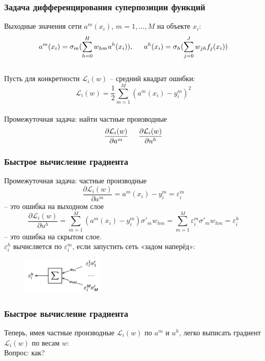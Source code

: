 \documentclass[12pt]{beamer}
\begin{document}
\begin{frame}\frametitle{Задача дифференцирования суперпозиции функций}
Выходные значения сети $a^m(x_i)$, $m = 1,\dots,M$ на объекте $x_i$:\\
$$a^m(x_i) = \sigma_m (\sum\limits_{h=0}^H w_{hm} u^h(x_i)), \hspace{5mm} u^h(x_i) = \sigma_h (\sum\limits_{j=0}^J w_{jh} f_j(x_i))$$\\
Пусть для конкретности $\mathcal{L}_i(w)$ -- средний квадрат ошибки:\\
$$\mathcal{L}_i(w) = \frac{1}{2} \sum\limits_{m=1}^M (a^m(x_i) - y_i^m)^2$$\\
Промежуточная задача: найти частные производные\\
$$\frac {\partial \mathcal{L}_i(w)}{\partial a^m} \hspace{5mm} \frac {\partial \mathcal{L}_i(w)}{\partial u^h}$$
\end{frame}

\begin{frame}\frametitle{Быстрое вычисление градиента}
Промежуточная задача: частные производные\\
$$\frac{\partial \mathcal{L}_i(w)}{\partial a^m} = a^m (x_i) - y_i^m = \varepsilon^m_i$$ -- это ошибка на выходном слое\\
$$\frac{\partial \mathcal{L}_i(w)}{\partial u^h} = \sum\limits_{m=1}^M (a^m(x_i) - y_i^m) \sigma'_m w_{hm} = \sum\limits_{m=1}^M \varepsilon^m_i \sigma'_m w_{hm} = \varepsilon^h_i$$ -- это ошибка на скрытом слое. \\
$\varepsilon_i^h$ вычисляется по $\varepsilon_i^m$, если запустить сеть «задом наперёд»:\\

\begin{figure}[htbp]
  \includegraphics[height=50pt, keepaspectratio = true]{images/backpropagation}   
\end{figure}

\end{frame}

\begin{frame}\frametitle{Быстрое вычисление градиента}
Теперь, имея частные производные $\mathcal{L}_i(w)$ по $a^m$ и $u^h$, легко выписать градиент $\mathcal{L}_i(w)$ по весам $w$:\\
\vspace{5mm}
Вопрос: как?
\end{frame}
\end{document}
